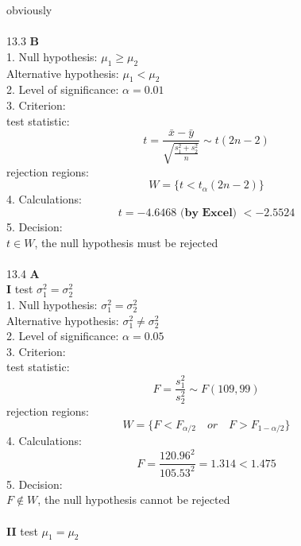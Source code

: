 \documentclass[a4paper]{ctexart}    %
\begin{document}
	obviously \\ \\
	13.3 \quad \textbf{B} \\
	1. Null hypothesis: $ \mu_1 \geq \mu_2 $ \\
	Alternative hypothesis: $ \mu_1 < \mu_2 $ \\
	2. Level of significance: $ \alpha = 0.01 $ \\
	3. Criterion: \\
	test statistic: 
	\begin{equation*}
		t = \frac{\bar{x} - \bar{y}}{\sqrt{\frac{s_1^2 + s_2^2}{n}}} \sim t(2n - 2)
	\end{equation*}
	rejection regions:
	\begin{equation*}
		W = \{t < t_{\alpha}(2n-2)\}
	\end{equation*}
	4. Calculations: \\
	\begin{equation*}
		t = -4.6468\textbf{ (by Excel) } < -2.5524
	\end{equation*}
	5. Decision: \\
	$ t \in W $, the null hypothesis must be rejected \\ \\
	13.4 \quad \textbf{A} \\
	\textbf{I} test $ \sigma_1^2 = \sigma_2^2 $ \\
	1. Null hypothesis: $ \sigma_1^2 = \sigma_2^2 $ \\
	Alternative hypothesis: $ \sigma_1^2 \neq \sigma_2^2 $ \\
	2. Level of significance: $ \alpha = 0.05 $ \\
	3. Criterion: \\
	test statistic:
	\begin{equation*}
		F = \frac{s_1^2}{s_2^2} \sim F(109, 99)
	\end{equation*}
	rejection regions:
	\begin{equation*}
		W = \{ F < F_{\alpha/2} \quad or \quad F > F_{1-\alpha/2} \} 
	\end{equation*}
	4. Calculations:
	\begin{equation*}
		F = \frac{120.96^2}{105.53^2} = 1.314 < 1.475
	\end{equation*}
	5. Decision: \\
	$ F \notin W $, the null hypothesis cannot be rejected \\ \\
	\textbf{II} test $ \mu_1 = \mu_2 $ \\
\end{document}
